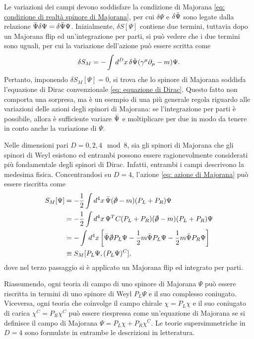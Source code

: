 Le variazioni dei campi devono soddisfare la condizione di Majorana \eqref{eq: condizione di realtà spinore di Majorana}, per cui $\delta\Psi$ e $\delta\bar{\Psi}$ sono legate dalla relazione $\bar{\Psi}\delta\Psi = \delta\bar{\Psi}\Psi$. Inizialmente, $\delta S[\Psi]$ contiene due termini, tuttavia dopo un Majorana flip ed un'integrazione per parti, si può vedere che i due termini sono uguali, per cui la variazione dell'azione può essere scritta come 
\begin{equation}
    \delta S_M = -\int d^Dx\,\delta\bar{\Psi}(\gamma^\mu\partial_\mu - m)\Psi.
\end{equation}
Pertanto, imponendo $\delta S_M[\Psi] = 0$, si trova che lo spinore di Majorana soddisfa l'equazione di Dirac convenzionale \eqref{eq: equazione di Dirac}. Questo fatto non comporta una sorpresa, ma è un esempio di una più generale regola riguardo alle variazioni delle azioni degli spinori di Majorana: se l'integrazione per parti è possibile, allora è sufficiente variare $\bar{\Psi}$ e moltiplicare per due in modo da tenere in conto anche la variazione di $\Psi$. 

Nelle dimensioni pari $D = 0,2,4\mod{8}$, sia gli spinori di Majorana che gli spinori di Weyl esistono ed entrambi possono essere ragionevolmente considerati più fondamentale degli spinori di Dirac. Infatti, entrambi i campi descrivono la medesima fisica. Concentrandosi su $D = 4$, l'azione \eqref{eq: azione di Majorana} può essere riscritta come 
\begin{equation}
    \begin{split}
        S_M[\Psi] &= -\frac{1}{2}\int d^4x\,\b{\Psi}(\sl{\p} - m)(P_L + P_R)\Psi \\
        &= -\frac{1}{2}\int d^4x\,\Psi^TC(P_L + P_R)(\sl{\p} - m)(P_L + P_R)\Psi \\
        &= -\int d^4x\,\bigg[\b{\Psi}\sl{\p}P_L\Psi  - \frac{1}{2}m\b{\Psi}P_L\Psi - \frac{1}{2}m\b{\Psi}P_R\Psi \bigg] \\
        &\equiv S_M[P_L\Psi,(P_L\Psi)^C],
    \end{split}
\end{equation}
dove nel terzo passaggio si è applicato un Majorana flip ed integrato per parti. 

Riassumendo, ogni teoria di campo di uno spinore di Majorana $\Psi$ può essere riscritta in termini di uno spinore di Weyl $P_L\Psi$ e il suo complesso coniugato. Viceversa, ogni teoria che coinvolge il campo chirale $\chi = P_L\chi$ e il suo coniugato di carica $\chi^C = P_R\chi^C$ può essere riespressa come un'equazione di Majorana se si definisce il campo di Majorana $\Psi = P_L\chi + P_R\chi^C$. Le teorie supersimmetriche in $D = 4$ sono formulate in entrambe le descrizioni in letteratura. 

